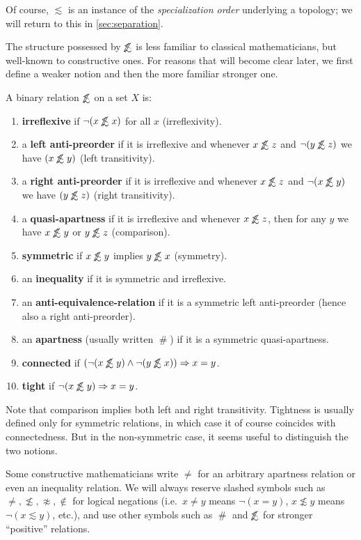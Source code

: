 \documentclass{article}
\def\apart{\mathrel{\#}}
\def\napprox{\not\approx}
\def\oapt{\mathrel{\!\not\,\not\lesssim}}
\def\leapx{\lesssim}
\let\implies\Rightarrow
\begin{document}
Of course, $\leapx$ is an instance of the \emph{specialization order} underlying a topology; we will return to this in \cref{sec:separation}.

The structure possessed by $\oapt$ is less familiar to classical mathematicians, but well-known to constructive ones.  
For reasons that will become clear later, we first define a weaker notion and then the more familiar stronger one.

\begin{defn}\label{def:anti-preorder}
  A binary relation $\oapt$ on a set $X$ is:
  \begin{enumerate}
  \item \textbf{irreflexive} if $\neg(x\oapt x)$ for all $x$ (irreflexivity).
  \item a \textbf{left anti-preorder} if it is irreflexive and whenever $x\oapt z$ and $\neg(y\oapt z)$ we have $(x\oapt y)$ (left transitivity).
  \item a \textbf{right anti-preorder} if it is irreflexive and whenever $x\oapt z$ and $\neg(x\oapt y)$ we have $(y\oapt z)$ (right transitivity).
  \item a \textbf{quasi-apartness} if it is irreflexive and whenever $x\oapt z$, then for any $y$ we have $x\oapt y$ or $y\oapt z$ (comparison).
  \item \textbf{symmetric} if $x\oapt y$ implies $y\oapt x$ (symmetry).
  \item an \textbf{inequality} if it is symmetric and irreflexive.
  \item an \textbf{anti-equivalence-relation} if it is a symmetric left anti-preorder (hence also a right anti-preorder).
  \item an \textbf{apartness} (usually written $\apart$) if it is a symmetric quasi-apartness.
  \item \textbf{connected} if $(\neg(x\oapt y)\land \neg(y\oapt x))\implies x=y$.
  \item \textbf{tight} if $\neg(x\oapt y) \implies x=y$.
  \end{enumerate}
\end{defn}

Note that comparison implies both left and right transitivity.
Tightness is usually defined only for symmetric relations, in which case it of course coincides with connectedness.
But in the non-symmetric case, it seems useful to distinguish the two notions.

\begin{warn}
  Some constructive mathematicians write $\neq$ for an arbitrary apartness relation or even an inequality relation.
  We will always reserve slashed symbols such as $\neq,\not\leapx,\napprox,\notin$ for logical negations (i.e.\ $x\neq y$ means $\neg(x=y)$, $x\not\leapx y$ means $\neg(x\leapx y)$, etc.), and use other symbols such as $\apart$ and $\oapt$ for stronger ``positive'' relations.
\end{warn}
\end{document}
